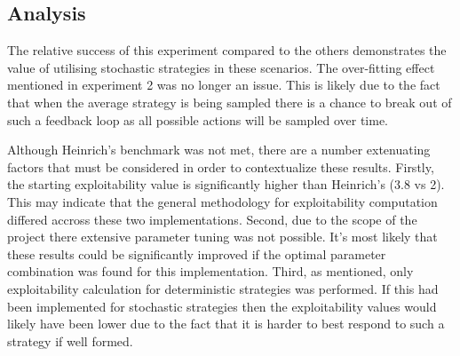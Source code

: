 \subsection{Analysis}\label{subsec:analysis3}
The relative success of this experiment compared to the others demonstrates the value of
utilising stochastic strategies in these scenarios.
The over-fitting effect mentioned in experiment 2 was no longer an issue.
This is likely due to the fact that when the average strategy is being sampled there is a
chance to break out of such a feedback loop as all possible actions will be sampled over time.

Although Heinrich's benchmark was not met, there are a number extenuating factors that must be
considered in order to contextualize these results.
Firstly, the starting exploitability value is significantly higher than Heinrich's (3.8 vs 2).
This may indicate that the general methodology for exploitability computation differed accross these
two implementations.
Second, due to the scope of the project there extensive parameter tuning was not possible.
It's most likely that these results could be significantly improved if the optimal parameter
combination was found for this implementation.
Third, as mentioned, only exploitability calculation for deterministic strategies was performed.
If this had been implemented for stochastic strategies then the exploitability values would
likely have been lower due to the fact that it is harder to best respond to such a strategy if well formed.